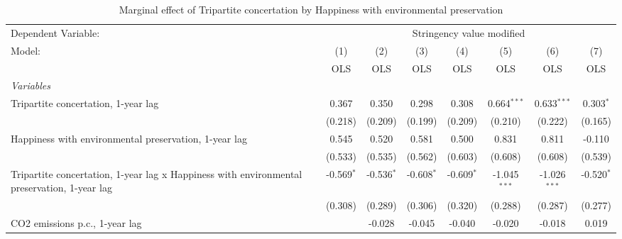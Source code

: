 
\begin{table}[htbp]
   \caption{Marginal effect of Tripartite concertation by Happiness with environmental preservation}
   \centering
   \begin{tabular}{lccccccc}
      \toprule
      Dependent Variable: & \multicolumn{7}{c}{Stringency value modified}\\
      Model:                                                                                      & (1)          & (2)          & (3)           & (4)           & (5)            & (6)            & (7)\\  
                                                                                                  &  OLS         & OLS          & OLS           & OLS           & OLS            & OLS            & OLS\\  
      \midrule
      \emph{Variables}\\
      Tripartite concertation, 1-year lag                                                         & 0.367        & 0.350        & 0.298         & 0.308         & 0.664$^{***}$  & 0.633$^{***}$  & 0.303$^{*}$\\   
                                                                                                  & (0.218)      & (0.209)      & (0.199)       & (0.209)       & (0.210)        & (0.222)        & (0.165)\\   
      Happiness with environmental preservation, 1-year lag                                       & 0.545        & 0.520        & 0.581         & 0.500         & 0.831          & 0.811          & -0.110\\   
                                                                                                  & (0.533)      & (0.535)      & (0.562)       & (0.603)       & (0.608)        & (0.608)        & (0.539)\\   
      Tripartite concertation, 1-year lag x Happiness with environmental preservation, 1-year lag & -0.569$^{*}$ & -0.536$^{*}$ & -0.608$^{*}$  & -0.609$^{*}$  & -1.045$^{***}$ & -1.026$^{***}$ & -0.520$^{*}$\\   
                                                                                                  & (0.308)      & (0.289)      & (0.306)       & (0.320)       & (0.288)        & (0.287)        & (0.277)\\   
      CO2 emissions p.c., 1-year lag                                                              &              & -0.028       & -0.045        & -0.040        & -0.020         & -0.018         & 0.019\\   

\end{tabular}
\end{table}
